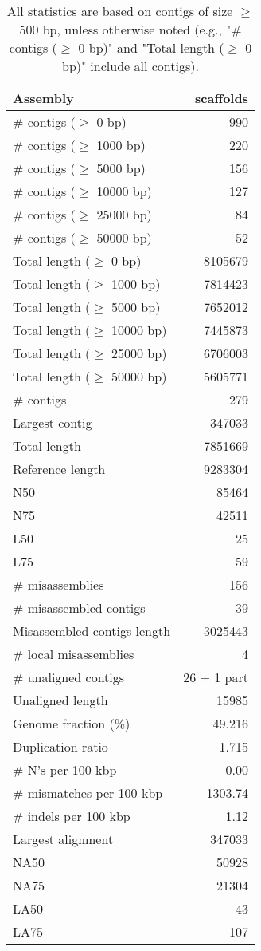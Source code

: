 \documentclass[12pt,a4paper]{article}
\begin{document}
\begin{table}[ht]
\begin{center}
\caption{All statistics are based on contigs of size $\geq$ 500 bp, unless otherwise noted (e.g., "\# contigs ($\geq$ 0 bp)" and "Total length ($\geq$ 0 bp)" include all contigs).}
\begin{tabular}{|l*{1}{|r}|}
\hline
Assembly & scaffolds \\ \hline
\# contigs ($\geq$ 0 bp) & 990 \\ \hline
\# contigs ($\geq$ 1000 bp) & 220 \\ \hline
\# contigs ($\geq$ 5000 bp) & 156 \\ \hline
\# contigs ($\geq$ 10000 bp) & 127 \\ \hline
\# contigs ($\geq$ 25000 bp) & 84 \\ \hline
\# contigs ($\geq$ 50000 bp) & 52 \\ \hline
Total length ($\geq$ 0 bp) & 8105679 \\ \hline
Total length ($\geq$ 1000 bp) & 7814423 \\ \hline
Total length ($\geq$ 5000 bp) & 7652012 \\ \hline
Total length ($\geq$ 10000 bp) & 7445873 \\ \hline
Total length ($\geq$ 25000 bp) & 6706003 \\ \hline
Total length ($\geq$ 50000 bp) & 5605771 \\ \hline
\# contigs & 279 \\ \hline
Largest contig & 347033 \\ \hline
Total length & 7851669 \\ \hline
Reference length & 9283304 \\ \hline
N50 & 85464 \\ \hline
N75 & 42511 \\ \hline
L50 & 25 \\ \hline
L75 & 59 \\ \hline
\# misassemblies & 156 \\ \hline
\# misassembled contigs & 39 \\ \hline
Misassembled contigs length & 3025443 \\ \hline
\# local misassemblies & 4 \\ \hline
\# unaligned contigs & 26 + 1 part \\ \hline
Unaligned length & 15985 \\ \hline
Genome fraction (\%) & 49.216 \\ \hline
Duplication ratio & 1.715 \\ \hline
\# N's per 100 kbp & 0.00 \\ \hline
\# mismatches per 100 kbp & 1303.74 \\ \hline
\# indels per 100 kbp & 1.12 \\ \hline
Largest alignment & 347033 \\ \hline
NA50 & 50928 \\ \hline
NA75 & 21304 \\ \hline
LA50 & 43 \\ \hline
LA75 & 107 \\ \hline
\end{tabular}
\end{center}
\end{table}
\end{document}
